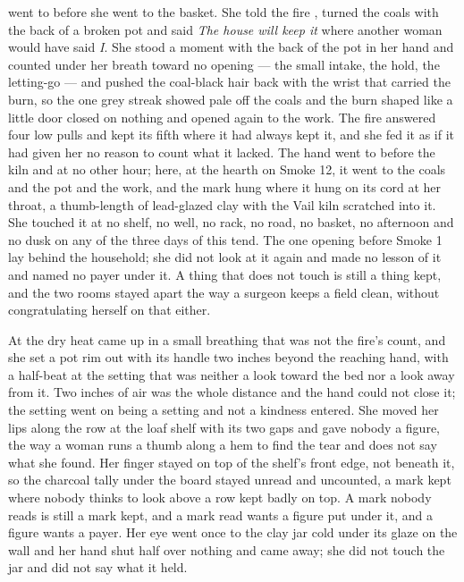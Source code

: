  went to  before she went to the basket. She told the fire , turned the coals with the back of a broken pot and said \emph{The house will keep it} where another woman would have said \emph{I}. She stood a moment with the back of the pot in her hand and counted under her breath toward no opening --- the small intake, the hold, the letting-go --- and pushed the coal-black hair back with the wrist that carried the burn, so the one grey streak showed pale off the coals and the burn shaped like a little door closed on nothing and opened again to the work. The fire answered four low pulls and kept its fifth where it had always kept it, and she fed it as if it had given her no reason to count what it lacked. The hand went to  before the kiln and at no other hour; here, at the hearth on Smoke 12, it went to the coals and the pot and the work, and the mark hung where it hung on its cord at her throat, a thumb-length of lead-glazed clay with the Vail kiln scratched into it. She touched it at no shelf, no well, no rack, no road, no basket, no afternoon and no dusk on any of the three days of this tend. The one opening before Smoke 1 lay behind the household; she did not look at it again and made no lesson of it and named no payer under it. A thing that does not touch is still a thing kept, and the two rooms stayed apart the way a surgeon keeps a field clean, without congratulating herself on that either.

At  the dry heat came up in a small breathing that was not the fire's count, and she set a pot rim out with its handle two inches beyond the reaching hand, with a half-beat at the setting that was neither a look toward the bed nor a look away from it. Two inches of air was the whole distance and the hand could not close it; the setting went on being a setting and not a kindness entered. She moved her lips along the row at the loaf shelf with its two gaps and gave nobody a figure, the way a woman runs a thumb along a hem to find the tear and does not say what she found. Her finger stayed on top of the shelf's front edge, not beneath it, so the charcoal tally under the board stayed unread and uncounted, a mark kept where nobody thinks to look above a row kept badly on top. A mark nobody reads is still a mark kept, and a mark read wants a figure put under it, and a figure wants a payer. Her eye went once to the clay jar cold under its glaze on the wall and her hand shut half over nothing and came away; she did not touch the jar and did not say what it held.

